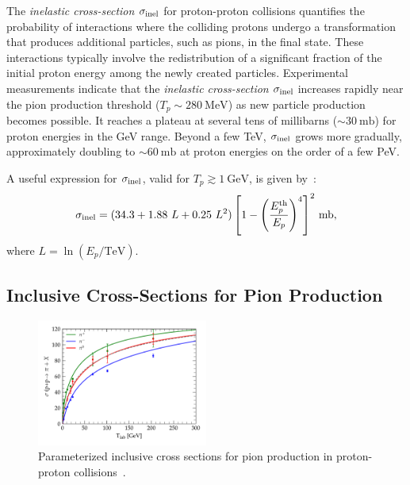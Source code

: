 The \emph{inelastic cross-section} \(\sigma_{\rm inel}\) for proton-proton collisions quantifies the probability of interactions where the colliding protons undergo a transformation that produces additional particles, such as pions, in the final state. These interactions typically involve the redistribution of a significant fraction of the initial proton energy among the newly created particles.
%
Experimental measurements indicate that the \emph{inelastic cross-section} \(\sigma_{\rm inel}\) increases rapidly near the pion production threshold (\(T_p \sim 280~\text{MeV}\)) as new particle production becomes possible. It reaches a plateau at several tens of millibarns (\(\sim 30~\text{mb}\)) for proton energies in the GeV range. Beyond a few TeV, \(\sigma_{\rm inel}\) grows more gradually, approximately doubling to \(\sim 60~\text{mb}\) at proton energies on the order of a few PeV.

A useful expression for \(\sigma_{\rm inel}\), valid for \(T_p \gtrsim 1~\text{GeV}\), is given by~\cite{Kelner2006prd}:
\begin{equation}
\sigma_{\rm inel} = (34.3 + 1.88~L + 0.25~L^2) \left[ 1 - \left( \frac{E^{\rm th}_p}{E_p} \right)^4 \right]^2 \, \text{mb},
\end{equation}
where \(L = \ln(E_p / \text{TeV})\). 

\subsection{Inclusive Cross-Sections for Pion Production }

\begin{figure}[t]
\centering
\includegraphics[width=0.5\textwidth]{figures/pion_production.pdf}
\caption{Parameterized inclusive cross sections for pion production in proton-proton collisions~\cite{Norbury2009nimpb}.}
\label{fig:pionprod}
\end{figure}

